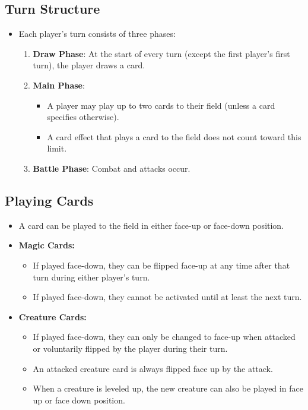 \subsection{Turn Structure}
\begin{itemize}
\item Each player's turn consists of three phases:
	\begin{enumerate}
	    \item \textbf{Draw Phase}: At the start of every turn (except the first player's first turn), the player draws a card.
	    \item \textbf{Main Phase}:
	    \begin{itemize}
	        \item A player may play up to two cards to their field (unless a card specifies otherwise).
	        \item A card effect that plays a card to the field does not count toward this limit.
	    \end{itemize}
	    \item \textbf{Battle Phase}: Combat and attacks occur.
	\end{enumerate}
\end{itemize}








\subsection{Playing Cards}
\begin{itemize}
    \item A card can be played to the field in either face-up or face-down position.
    \item \textbf{Magic Cards:}
    \begin{itemize}
        \item If played face-down, they can be flipped face-up at any time after that turn during either player's turn.
        \item If played face-down, they cannot be activated until at least the next turn.
    \end{itemize}
    \item \textbf{Creature Cards:}
    \begin{itemize}
        \item If played face-down, they can only be changed to face-up when attacked or voluntarily flipped by the player during their turn.
        \item An attacked creature card is always flipped face up by the attack.
        \item When a creature is leveled up, the new creature can also be played in face up or face down position.
    \end{itemize}
\end{itemize}






